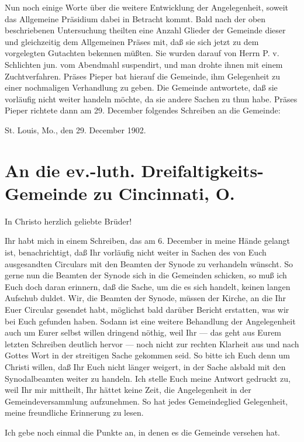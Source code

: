 Nun noch einige Worte über die weitere Entwicklung der Angelegenheit, soweit das Allgemeine Präsidium dabei in Betracht kommt. Bald nach der oben beschriebenen Untersuchung theilten eine Anzahl Glieder der Gemeinde dieser und gleichzeitig dem Allgemeinen Präses mit, daß sie sich jetzt zu dem vorgelegten Gutachten bekennen müßten. Sie wurden darauf von Herrn P. v. Schlichten jun. vom Abendmahl suspendirt, und man drohte ihnen mit einem Zuchtverfahren. Präses Pieper bat hierauf die Gemeinde, ihm Gelegenheit zu einer nochmaligen Verhandlung zu geben. Die Gemeinde antwortete, daß sie vorläufig nicht weiter handeln möchte, da sie andere Sachen zu thun habe. Präses Pieper richtete dann am 29. December folgendes Schreiben an die Gemeinde:

St. Louis, Mo., den 29. December 1902.

\section[An die Dreifaltigkeits-Gemeinde]{An die ev.-luth. Dreifaltigkeits-Gemeinde zu Cincinnati, O.}

In Christo herzlich geliebte Brüder!

Ihr habt mich in einem Schreiben, das am 6. December in meine Hände gelangt ist, benachrichtigt, daß Ihr vorläufig nicht weiter in Sachen des von Euch ausgesandten Circulars mit den Beamten der Synode zu verhandeln wünscht. So gerne nun die Beamten der Synode sich in die Gemeinden schicken, so muß ich Euch doch daran erinnern, daß die Sache, um die es sich handelt, keinen langen Aufschub duldet. Wir, die Beamten der Synode, müssen der Kirche, an die Ihr Euer Circular gesendet habt, möglichst bald darüber Bericht erstatten, was wir bei Euch gefunden haben. Sodann ist eine weitere Behandlung der Angelegenheit auch um Eurer selbst willen dringend nöthig, weil Ihr — das geht aus Eurem letzten Schreiben deutlich hervor — noch nicht zur rechten Klarheit aus und nach Gottes Wort in der streitigen Sache gekommen seid. So bitte ich Euch denn um Christi willen, daß Ihr Euch nicht länger weigert, in der Sache alsbald mit den Synodalbeamten weiter zu handeln. Ich stelle Euch meine Antwort gedruckt zu, weil Ihr mir mittheilt, Ihr hättet keine Zeit, die Angelegenheit in der Gemeindeversammlung aufzunehmen. So hat jedes Gemeindeglied Gelegenheit, meine freundliche Erinnerung zu lesen.

Ich gebe noch einmal die Punkte an, in denen es die Gemeinde versehen hat.

